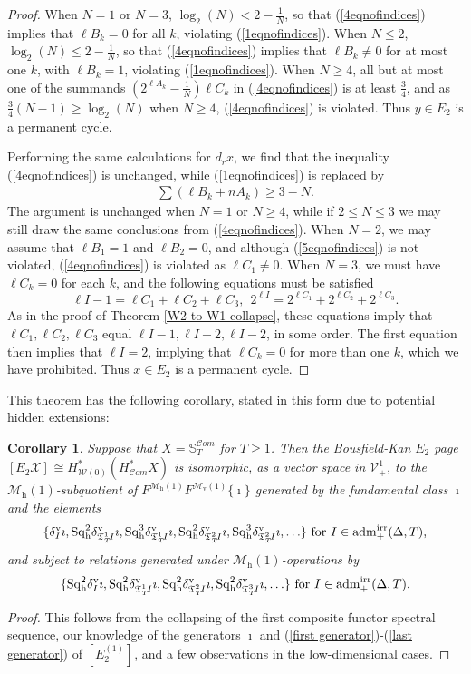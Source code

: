 \documentclass[11pt]{amsart} \renewcommand{\baselinestretch}{1.2}
\theoremstyle{plain}
\newtheorem{cor}[thm]{Corollary}
\theoremstyle{definition}
\newcommand{\scrC}{\mathscr{C}}
\newcommand{\calV}{\mathcal{V}}
\newcommand{\calw}{\mathcal{W}}
\newcommand{\calx}{\mathcal{X}}
\newcommand{\calMv}{\mathcal{M}\dver}
\newcommand{\calMh}{\mathcal{M}\dhor}
\newcommand{\vect}[2]{\calV^{#1}_{#2}}
\newcommand{\aDTirr}{\mathrm{adm}_+^\mathrm{irr}(\Delta,T)}
\newcommand{\algs}{{\scrC\!\textit{om}}}
\newcommand{\TOP}{\mathfrak{T}}
\newcommand{\E}[5]{[E^{#1}_{#2}#3]^{#4}_{#5}}
\newcommand{\uver}{^\mathrm{v}}
\newcommand{\dver}{_\mathrm{v}}
\newcommand{\dhor}{_\mathrm{h}}
\newcommand{\Sqh}{\mathrm{Sq}\dhor}
\newcommand{\deltav}{\delta\uver}
\begin{document}
\begin{Calculations of HWn}
\begin{proof}
When $N=1$ or $N=3$, $\log_2(N)<2-\frac{1}{N}$, so that (\ref{4eqnofindices}) implies that $\ell B_k=0$ for all $k$, violating (\ref{1eqnofindices}).
When $N\leq2$, $\log_2(N)\leq 2-\frac{1}{N}$, so that (\ref{4eqnofindices}) implies that $\ell B_k\neq0$ for at most one $k$, with $\ell B_k=1$, violating (\ref{1eqnofindices}).
When $N\geq4$, all but at most one of the summands $(2^{\ell A_k}-\frac{1}{N})\ell C_k$ in (\ref{4eqnofindices}) is at least $\frac{3}{4}$, and as $\frac{3}{4}(N-1)\geq\log_2(N)$ when $N\geq4$, (\ref{4eqnofindices}) is violated. Thus $y\in E_2$ is a permanent cycle.

Performing the same calculations for $d_rx$, we find that the inequality (\ref{4eqnofindices}) is unchanged, while (\ref{1eqnofindices}) is replaced by
\begin{gather}
\textstyle \sum(\ell B_k+nA_k)\geq3-N.\label{5eqnofindices}\end{gather}
The argument is unchanged when $N=1$ or $N\geq4$, while if $2\leq N\leq3$ we may still draw the same conclusions from (\ref{4eqnofindices}). When $N=2$, we may assume that $\ell B_1=1$ and $\ell B_2=0$, and although (\ref{5eqnofindices}) is not violated, (\ref{4eqnofindices}) is violated as $\ell C_1\neq0$. When $N=3$, we must have $\ell C_k=0$ for each $k$, and the following equations must be satisfied
\[\ell I-1=\ell C_1+\ell C_2+\ell C_3,\ \  2^{\ell I}=2^{\ell C_1}+2^{\ell C_2}+2^{\ell C_3}.\]
As in the proof of Theorem \ref{W2 to W1 collapse}, these equations imply that $\ell C_1,\ell C_2,\ell C_3$ equal $\ell I-1,\ell I-2,\ell I-2$, in some order. The first equation then implies that $\ell I=2$, implying that $\ell C_k=0$ for more than one $k$, which we have prohibited. Thus $x\in E_2$ is a permanent cycle.
\end{proof}
This theorem has the following corollary, stated in this form due to potential hidden extensions:
\begin{cor}
\label{the corollary on the bousfield kan e2}
Suppose that $X=\mathbb{S}_{T}^{\algs}$ for $T\geq1$. Then the Bousfield-Kan $E_2$ page $\E{}{2}{\calx}{}{}\cong H^*_{\calw(0)}(H^*_\algs X)$ is isomorphic, as a vector space in $\vect{1}{+}$, to the $\calMh(1)$-subquotient of $F^{\calMh(1)}F^{\calMv(1)}\{\imath\}$ generated by 
the fundamental class $\imath$ and the elements
\[
\{\deltav_{I}\imath,
\Sqh^2\deltav_{\TOP_T^1\!I}\imath,\Sqh^3\deltav_{\TOP_T^1\!I}\imath,
\Sqh^2\deltav_{\TOP_T^2\!I}\imath,\Sqh^3\deltav_{\TOP_T^2\!I}\imath,
\ldots\}\textup{ for $I\in\aDTirr$,}
\]
and subject to  relations generated under $\calMh(1)$-operations by
\[\{
\Sqh^2\deltav_{I}\imath,
\Sqh^2\deltav_{\TOP_T^1\!I}\imath,
\Sqh^2\deltav_{\TOP_T^2\!I}\imath,
\Sqh^2\deltav_{\TOP_T^3\!I}\imath,
\ldots\}\textup{ for $I\in\aDTirr$.}
\]
\end{cor}
\begin{proof}
This follows from the collapsing of the first composite functor spectral sequence, our knowledge of the generators $\imath$ and (\ref{first generator})-(\ref{last generator}) of $\E{(1)}{2}{}{}{}$, and  a few observations in the low-dimensional cases. 


\end{proof}
\end{Calculations of HWn}
\end{document}

